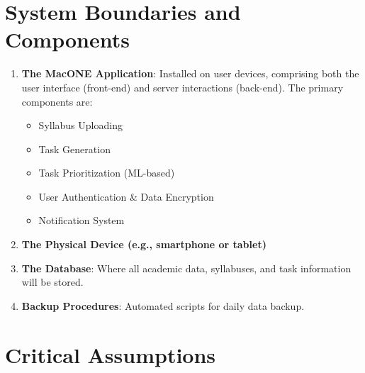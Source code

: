 \documentclass{article}
\begin{document}
\section{System Boundaries and Components}
\begin{enumerate}
    \item \textbf{The MacONE Application}: Installed on user devices, comprising both the user interface (front-end) and server interactions (back-end). The primary components are:
    \begin{itemize}
        \item Syllabus Uploading
        \item Task Generation
        \item Task Prioritization (ML-based)
        \item User Authentication \& Data Encryption
        \item Notification System
    \end{itemize}
    
    \item \textbf{The Physical Device (e.g., smartphone or tablet)}
    \item \textbf{The Database}: Where all academic data, syllabuses, and task information will be stored.
    \item \textbf{Backup Procedures}: Automated scripts for daily data backup.
\end{enumerate}

\section{Critical Assumptions}
\end{document}
